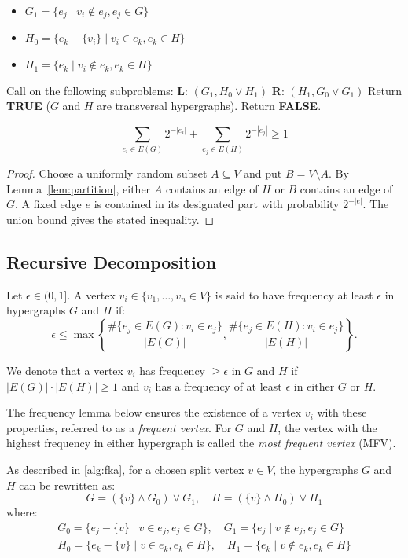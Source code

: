 \begin{algorithm}[p]
\begin{algorithmic}[1]
\begin{minipage}{0.8\linewidth}
\begin{itemize}
\item $G_1=\{e_j\mid v_i\notin e_j,e_j\in G\}$
\item $H_0=\{e_k-\{v_i\}\mid v_i\in e_k,e_k\in H\}$
\item $H_1=\{e_k\mid v_i\notin e_k,e_k\in H\}$
\end{itemize}
\end{minipage}
\State Call \FKA{} on the following subproblems:
\State \textbf{L}: $(G_1,H_0\vee H_1)$
\State \textbf{R}: $(H_1,G_0\vee G_1)$
\State Return \textbf{TRUE} ($G$ and $H$ are transversal hypergraphs).
\Else
\State Return \textbf{FALSE}.
\EndIf
\EndIf
\end{algorithmic}
\end{algorithm}

\begin{proposition}\label{prop:sum}
\[
\sum_{e_i\in E(G)}2^{-|e_i|}+\sum_{e_j\in E(H)}2^{-|e_j|}\geq 1
\]
\end{proposition}

\begin{proof}
Choose a uniformly random subset $A\subseteq V$ and put $B=V\setminus A$. By Lemma~\ref{lem:partition}, either $A$ contains an edge of $H$ or $B$ contains an edge of $G$. A fixed edge $e$ is contained in its designated part with probability $2^{-|e|}$. The union bound gives the stated inequality.
\end{proof}

\subsection{Recursive Decomposition}

Let $\epsilon\in(0,1]$. A vertex $v_i\in\{v_1,\dots,v_n\in V\}$ is said to have frequency at least $\epsilon$ in hypergraphs $G$ and $H$ if:
\[
\epsilon\leq\max\left\{\frac{\#\{e_j\in E(G):v_i\in e_j\}}{|E(G)|},\frac{\#\{e_j\in E(H):v_i\in e_j\}}{|E(H)|}\right\}.
\]

We denote that a vertex $v_i$ has frequency $\geq\epsilon$ in $G$ and $H$ if $|E(G)|\cdot|E(H)|\geq 1$ and $v_i$ has a frequency of at least $\epsilon$ in either $G$ or $H$.

The frequency lemma below ensures the existence of a vertex $v_i$ with these properties, referred to as a \emph{frequent vertex}. For $G$ and $H$, the vertex with the highest frequency in either hypergraph is called the \emph{most frequent vertex} (MFV).

As described in \ref{alg:fka}, for a chosen split vertex $v\in V$, the hypergraphs $G$ and $H$ can be rewritten as:
\[
G=(\{v\}\wedge G_0)\vee G_1,\quad H=(\{v\}\wedge H_0)\vee H_1
\]
where:
\begin{gather*}
G_0=\{e_j-\{v\}\mid v\in e_j,e_j\in G\},\quad G_1=\{e_j\mid v\notin e_j,e_j\in G\}\\
H_0=\{e_k-\{v\}\mid v\in e_k,e_k\in H\},\quad H_1=\{e_k\mid v\notin e_k,e_k\in H\}
\end{gather*}

